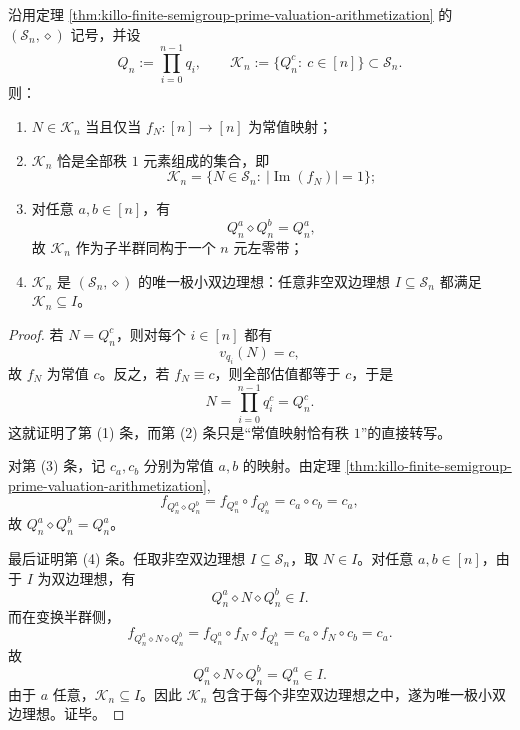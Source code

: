 \begin{theorem}[素数寄存器半群的唯一极小双边理想与左零带结构]\label{thm:xi-prime-register-minimal-ideal-left-zero-band}
沿用定理 \ref{thm:killo-finite-semigroup-prime-valuation-arithmetization} 的 \((\mathcal S_n,\diamond)\) 记号，并设
\[
Q_n:=\prod_{i=0}^{n-1}q_i,
\qquad
\mathcal K_n:=\{Q_n^c:\ c\in[n]\}\subset \mathcal S_n.
\]
则：
\begin{enumerate}
  \item \(N\in \mathcal K_n\) 当且仅当 \(f_N:[n]\to[n]\) 为常值映射；
  \item \(\mathcal K_n\) 恰是全部秩 \(1\) 元素组成的集合，即
  \[
  \mathcal K_n=\{N\in\mathcal S_n:\ |\operatorname{Im}(f_N)|=1\};
  \]
  \item 对任意 \(a,b\in[n]\)，有
  \[
  \boxed{\;
  Q_n^a\diamond Q_n^b=Q_n^a,
  \;}
  \]
  故 \(\mathcal K_n\) 作为子半群同构于一个 \(n\) 元左零带；
  \item \(\mathcal K_n\) 是 \((\mathcal S_n,\diamond)\) 的唯一极小双边理想：任意非空双边理想 \(I\subseteq \mathcal S_n\) 都满足 \(\mathcal K_n\subseteq I\)。
\end{enumerate}
\end{theorem}
\begin{proof}
若 \(N=Q_n^c\)，则对每个 \(i\in[n]\) 都有
\[
v_{q_i}(N)=c,
\]
故 \(f_N\) 为常值 \(c\)。反之，若 \(f_N\equiv c\)，则全部估值都等于 \(c\)，于是
\[
N=\prod_{i=0}^{n-1}q_i^c=Q_n^c.
\]
这就证明了第 (1) 条，而第 (2) 条只是“常值映射恰有秩 \(1\)”的直接转写。

对第 (3) 条，记 \(c_a,c_b\) 分别为常值 \(a,b\) 的映射。由定理 \ref{thm:killo-finite-semigroup-prime-valuation-arithmetization},
\[
f_{Q_n^a\diamond Q_n^b}=f_{Q_n^a}\circ f_{Q_n^b}=c_a\circ c_b=c_a,
\]
故 \(Q_n^a\diamond Q_n^b=Q_n^a\)。

最后证明第 (4) 条。任取非空双边理想 \(I\subseteq \mathcal S_n\)，取 \(N\in I\)。对任意 \(a,b\in[n]\)，由于 \(I\) 为双边理想，有
\[
Q_n^a\diamond N\diamond Q_n^b\in I.
\]
而在变换半群侧，
\[
f_{Q_n^a\diamond N\diamond Q_n^b}
=
f_{Q_n^a}\circ f_N\circ f_{Q_n^b}
=
c_a\circ f_N\circ c_b
=
c_a.
\]
故
\[
Q_n^a\diamond N\diamond Q_n^b=Q_n^a\in I.
\]
由于 \(a\) 任意，\(\mathcal K_n\subseteq I\)。因此 \(\mathcal K_n\) 包含于每个非空双边理想之中，遂为唯一极小双边理想。证毕。
\end{proof}

